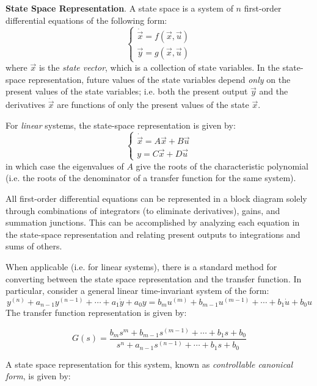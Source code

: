 \begin{shaded}
    \textbf{State Space Representation}. A state space is a system of $n$ first-order differential equations of the following form: \[\begin{cases}\dot{\vec{x}} = f(\vec{x}, \vec{u})\\
    \vec{y} = g(\vec{x},\vec{u})\end{cases}\] where $\vec{x}$ is the \textit{state vector}, which is a collection of state variables. In the state-space representation, future values of the state variables depend \textit{only} on the present values of the state variables; i.e. both the present output $\vec{y}$ and the derivatives $\dot{\vec{x}}$ are functions of only the present values of the state $\vec{x}$.

    For \textit{linear} systems, the state-space representation is given by: \[\begin{cases}
        \dot{\vec{x}} = A\vec{x} + B \vec{u}\\
        y = C\vec{x} + D \vec{u}
    \end{cases}\] in which case the eigenvalues of $A$ give the roots of the characteristic polynomial (i.e. the roots of the denominator of a transfer function for the same system).

    All first-order differential equations can be represented in a block diagram solely through combinations of integrators (to eliminate derivatives), gains, and summation junctions. This can be accomplished by analyzing each equation in the state-space representation and relating present outputs to integrations and sums of others.
\end{shaded}

When applicable (i.e. for linear systems), there is a standard method for converting between the state space representation and the transfer function. In particular, consider a general linear time-invariant system of the form: \[y^{(n)} + a_{n-1}y^{(n-1)} + \cdots + a_1\dot y + a_0 y = b_mu^{(m)} + b_{m-1}u^{(m-1)} + \cdots + b_1 \dot u + b_0 u\] The transfer function representation is given by:

\[G(s) = \frac{b_m s^m + b_{m-1}s^{(m-1)} + \cdots + b_1 s + b_0}{s^n + a_{n-1}s^{(n-1)} + \cdots + b_1 s + b_0}\]

A state space representation for this system, known as \textit{controllable canonical form}, is given by:

